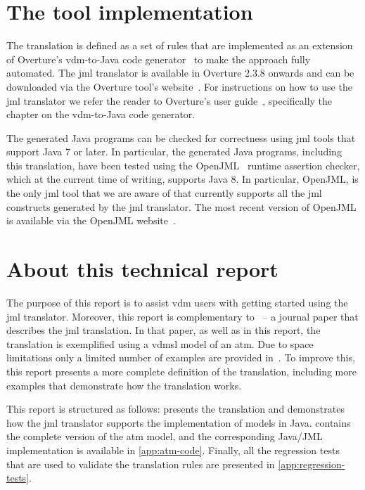 \section{The tool implementation}

The translation is defined as a set of rules that are implemented as
an extension of Overture's \ac{vdm}-to-Java code
generator~\cite{Jorgensen&14a} to make the approach fully
automated. The \ac{jml} translator is available in Overture 2.3.8
onwards and can be downloaded via the Overture tool's
website~\cite{Overture}. For instructions on how to use the \ac{jml}
translator we refer the reader to Overture's user
guide~\cite{Larsen&10d}, specifically the chapter on the
\ac{vdm}-to-Java code generator.

The generated Java programs can be checked for correctness using
\ac{jml} tools that support Java 7 or later. In particular, the
generated Java programs, including this translation, have been tested
using the OpenJML~\cite{Cok&11} runtime assertion checker, which at
the current time of writing, supports Java 8. In particular, OpenJML,
is the only \ac{jml} tool that we are aware of that currently supports
all the \ac{jml} constructs generated by the \ac{jml} translator. The
most recent version of OpenJML is available via the OpenJML
website~\cite{OpenJMLWebsite}.

\section{About this technical report}

The purpose of this report is to assist \ac{vdm} users with getting
started using the \ac{jml} translator. Moreover, this report is
complementary to~\cite{Jorgensen&16a} -- a journal paper that
describes the \ac{jml} translation. In that paper, as well as in this
report, the translation is exemplified using a \ac{vdmsl} model of an
\ac{atm}. Due to space limitations only a limited number of examples
are provided in~\cite{Jorgensen&16a}. To improve this, this report
presents a more complete definition of the translation, including more
examples that demonstrate how the translation works.

This report is structured as follows:  presents the
translation and demonstrates how the \ac{jml} translator supports the
implementation of \vsl models in Java.  contains
the complete version of the \ac{atm} model, and the corresponding
Java/JML implementation is available in \cref{app:atm-code}. Finally,
all the regression tests that are used to validate the translation
rules are presented in \cref{app:regression-tests}.

